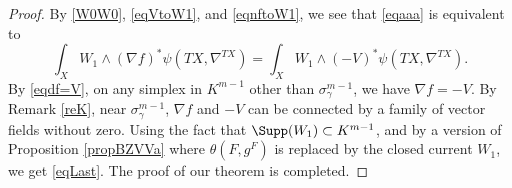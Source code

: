 \begin{proof}
By \eqref{W0W0}, \eqref{eqVtoW1}, and \eqref{eqnftoW1}, we see that \eqref{eqaaa} is equivalent to
\begin{equation}\label{eqLast}
\int_{X}W_{1} \wedge (\nabla
f)^{*}\psi(TX,\nabla^{TX})=\int_{X}W_{1}\wedge
(-V)^{*}\psi(TX,\nabla^{TX}).
\end{equation}
By \eqref{eqdf=V}, on any simplex in
$K^{m-1}$ other than $\sigma_{\gamma}^{m-1}$, we have $\nabla f=-V$.
By Remark \ref{reK}, near $\sigma_{\gamma}^{m-1}$, $\nabla
f$ and $-V$ can be connected by a family of vector fields without
zero. Using the fact that $\Supp(W_{1})\subset K^{m-1}$,
and by a version of Proposition \ref{propBZVVa} where
$\theta(F,g^{F})$ is replaced by the closed current $W_{1}$, we get \eqref{eqLast}.
The proof of our theorem is completed.
\end{proof}

